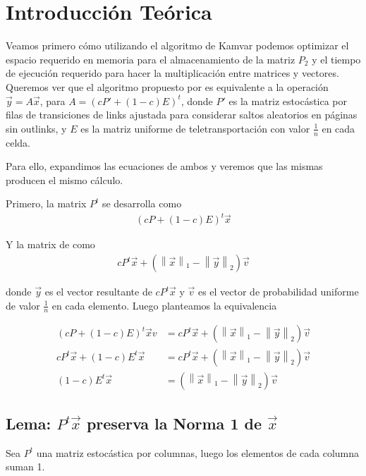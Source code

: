 \section{Introducción Teórica}

Veamos primero cómo utilizando el algoritmo de Kamvar podemos optimizar el espacio requerido en memoria para el almacenamiento de la matriz $P_2$ y el tiempo de ejecución requerido para hacer la multiplicación entre matrices y vectores.\\

\newcommand{\vectornorm}[1]{\left\|#1\right\|}
Queremos ver que el algoritmo propuesto por \cite[Algoritmo 1]{Kamvar2003} es equivalente
a la operación $\vec{y} = A\vec{x}$, para $A=(cP' + (1-c)E)^{t}$, donde $P'$ es la matriz 
estocástica por filas de transiciones de links ajustada para considerar saltos aleatorios
en páginas sin outlinks, y $E$ es la matriz uniforme de teletransportación con valor $\frac{1}{n}$ en cada celda.

Para ello, expandimos las ecuaciones de ambos y veremos que las mismas producen el mismo cálculo.

Primero, la matrix $P^{t}$ se desarrolla como 
\begin{align*}
(cP + (1 - c)E)^{t} \vec{x}
\end{align*}

Y la matrix de \cite[Algoritmo 1]{Kamvar 2003} como
\begin{align*}
cP^{t}\vec{x} + (\vectornorm{\vec{x}}_1 - \vectornorm{\vec{y}}_2)\vec{v}
\end{align*}

donde $\vec{y}$ es el vector resultante de $cP^{t}\vec{x}$ y $\vec{v}$ es el vector de probabilidad
uniforme de valor $\frac{1}{n}$ en cada elemento. Luego planteamos la equivalencia

\begin{align*}
(cP + (1-c)E)^{t} \vec{x} v&= cP^{t}\vec{x} + (\vectornorm{\vec{x}}_1 - \vectornorm{\vec{y}}_2)\vec{v} \\
cP^{t}\vec{x} + (1-c)E^{t}\vec{x} &= cP^{t}\vec{x} + (\vectornorm{\vec{x}}_1 - \vectornorm{\vec{y}}_2)\vec{v} \\
(1-c)E^{t}\vec{x} &= (\vectornorm{\vec{x}}_1 - \vectornorm{\vec{y}}_2)\vec{v}
\end{align*}

\subsection{Lema: $P^{t} \vec{x}$ preserva la Norma 1 de $\vec{x}$}
Sea $P^{t}$ una matriz estocástica por columnas, luego los elementos de cada columna suman 1.

